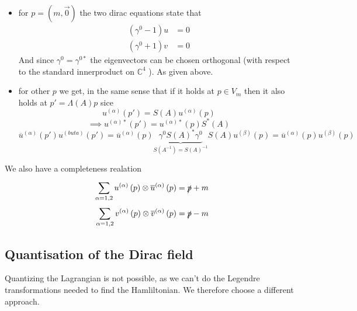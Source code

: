 \documentclass{report}
\begin{document}
\begin{itemize}
  \item for $p = \left( m, \vec{0} \right) $ the two dirac equations state that
    \begin{align*}
      \left( \gamma^{0} - 1 \right) u &= 0 \\
      \left( \gamma^{0} +1 \right) v &= 0
    \end{align*}
    And since $\gamma^{0} = \gamma^{0*}  $ the eigenvectors can be chosen orthogonal (with respect to the standard innerproduct on $\mathbb{C}^{4} $ ). As given above.
  \item for other $p$ we get, in the same sense that if it holds at $p \in V_m$ then it also holds at $p' = \Lambda\left( A \right) p$ sice \[
  u^{\left( \alpha \right) } \left( p' \right) = S\left( A \right) u^{\left( \alpha \right) } \left( p \right) 
  \] \[
  \implies u^{\left( \alpha \right) *} \left( p' \right) = u^{\left( \alpha \right) *} \left( p \right) S^{*} \left( A \right) 
  \] \[
  \overline{u}^{\left( \alpha \right) } \left( p' \right) u^{\left( buta \right) } \left( p' \right) =
  \overline{u}^{\left( \alpha \right) } \left( p \right) \underbrace{\gamma^{0} S\left( A \right) ^{*} \gamma^{0} }_{S\left( A^{-1}  \right) = S\left( A \right) ^{-1} } S\left( A \right) u^{\left( \beta \right) } \left( p \right) = \overline{u}^{\left( \alpha \right) } \left( p \right) u^{\left( \beta \right) } \left( p \right)  
  \] 
\end{itemize}
We also have a completeness realation
\begin{align*}
  \sum_{\alpha=1,2}^{} u^{\left( \alpha \right) } \left( p \right) \otimes \overline{u}^{\left( \alpha \right) } \left( p \right) &= \slashed{p} + m \\
  \sum_{\alpha=1,2}^{} v^{\left( \alpha \right) } \left( p \right) \otimes \overline{v}^{\left( \alpha \right) } \left( p \right) &= \slashed{p} - m 
\end{align*}
\subsection{Quantisation of the Dirac field}
Quantizing the Lagrangian is not possible, as we can't do the Legendre transformations needed to find the Hamliltonian. We therefore choose a different approach.\\
\end{document}
